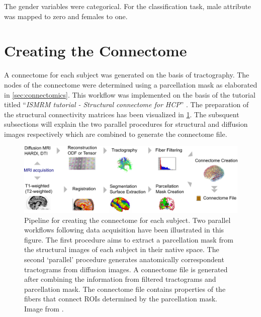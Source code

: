 \documentclass[msthesis.tex]{subfiles}
\begin{document}
The gender variables were categorical. For the classification task, male attribute was mapped to zero and females to one.

\section{Creating the Connectome}
\label{sec:creating_connectome}

A connectome for each subject was generated on the basis of tractography. The nodes of the connectome were determined using a parcellation mask as elaborated in \autoref{sec:connectomics}. This workflow was implemented on the basis of the tutorial titled ``\textit{ISMRM tutorial - Structural connectome for \gls{HCP}}''
. The preparation of the structural connectivity matrices has been visualized in \cref{fig:connectome_pipeline}. The subsquent subsections will explain the two parallel procedures for structural and diffusion images respectively which are combined to generate the connectome file. 
\begin{figure}
    \centering
    \includegraphics[width=\textwidth]{images/connectome_creation_workflow.png}
    \caption{Pipeline for creating the connectome for each subject. Two parallel workflows following data acquisition have been illustrated in this figure. The first procedure aims to extract a parcellation mask from the structural images of each subject in their native space. The second `parallel' procedure generates anatomically correspondent tractograms from diffusion images. A connectome file is generated after combining the information from filtered tractograms and parcellation mask. The connectome file contains properties of the fibers that connect \gls{ROI}s determined by the parcellation mask. Image from \cite{gerhard2011connectome}.}
    \label{fig:connectome_pipeline}
\end{figure}
\end{document}
